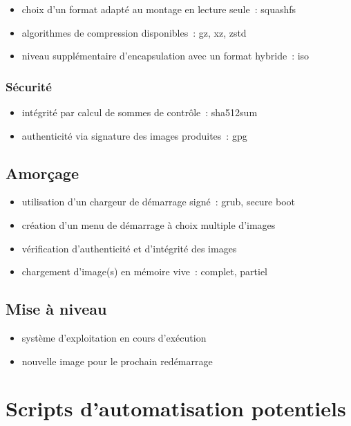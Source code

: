 \documentclass[12pt]{article}
\newenvironment{itmz}{\begin{itemize}
\setlength{\itemsep}{0em}
}{\end{itemize}}
\begin{document}
\begin{itmz}
\item{choix d’un format adapté au montage en lecture seule : squashfs}
\item{algorithmes de compression disponibles : gz, xz, zstd}
\item{niveau supplémentaire d’encapsulation avec un format hybride : iso}
\end{itmz}

\subsubsection{Sécurité}

\begin{itmz}
\item{intégrité par calcul de sommes de contrôle : sha512sum}
\item{authenticité via signature des images produites : gpg}
\end{itmz}

\subsection{Amorçage}

\begin{itmz}
\item{utilisation d’un chargeur de démarrage signé : grub, secure boot}
\item{création d’un menu de démarrage à choix multiple d’images}
\item{vérification d’authenticité et d’intégrité des images}
\item{chargement d’image(s) en mémoire vive : complet, partiel}
\end{itmz}

\subsection{Mise à niveau}

\begin{itmz}
\item{système d’exploitation en cours d’exécution}
\item{nouvelle image pour le prochain redémarrage}
\end{itmz}

\section{Scripts d’automatisation potentiels}
\end{document}
